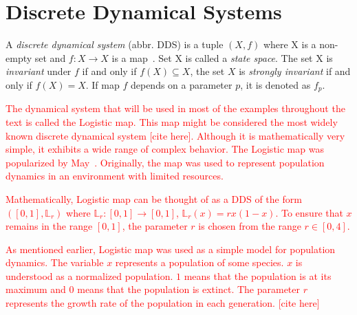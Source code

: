 \section{Discrete Dynamical Systems}

\begin{definition}
    A \emph{discrete dynamical system} (abbr. DDS) is a tuple $\left( X, f \right)$ where X is a non-empty set and $f: X \rightarrow X$ is a map~\cite{Brin20100706}.
    Set X is called a \emph{state space}.
    The set X is \emph{ invariant} under $f$ if and only if $f(X) \subseteq X$, the set $X$ is \emph{strongly invariant} if and only if $f(X) = X$.
    If map $f$ depends on a parameter $p$, it is denoted as $f_p$.
\end{definition}

\begin{remark}
    \textcolor{red}{
    The dynamical system that will be used in most of the examples throughout the text is called the Logistic map.
    This map might be considered the most widely known discrete dynamical system [cite here].
    Although it is mathematically very simple, it exhibits a wide range of complex behavior.
    The Logistic map was popularized by May~\cite{May19760610}.
    Originally, the map was used to represent population dynamics in an environment with limited resources.
    }
    \par
    \textcolor{red}{
    Mathematically, Logistic map can be thought of as a DDS of the form $\left( [0, 1], \mathbb{L}_{r} \right)$ where $\mathbb{L}_{r}: [0,1] \rightarrow [0,1]$, $\mathbb{L}_{r}(x) = rx(1-x)$.
    To ensure that $x$ remains in the range $[0,1]$, the parameter $r$ is chosen from the range $r \in [0, 4]$.
    }
    \par
    \textcolor{red}{
    As mentioned earlier, Logistic map was used as a simple model for population dynamics.
    The variable $x$ represents a population of some species.
    $x$ is understood as a normalized population.
    $1$ means that the population is at its maximum and $0$ means that the population is extinct.
    The parameter $r$ represents the growth rate of the population in each generation. [cite here]
    }
\end{remark}

